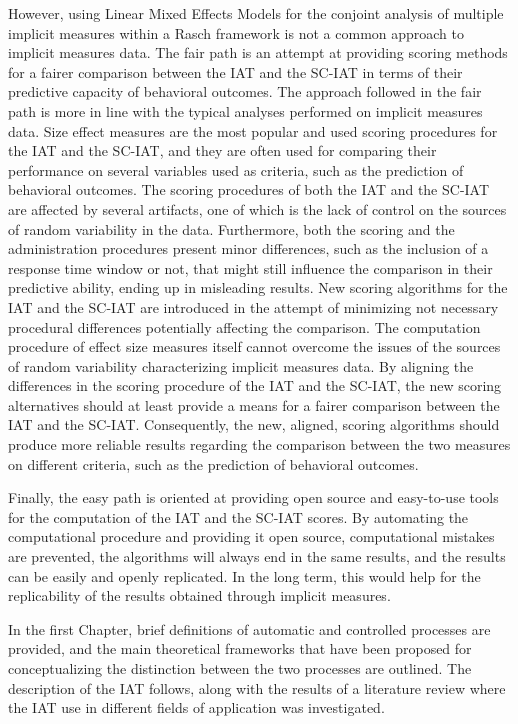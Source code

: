 \documentclass[12pt]{book}
\begin{document}
However, using Linear Mixed Effects Models for the conjoint analysis of multiple implicit measures within a Rasch framework is not a common approach to implicit measures data. The fair path is an attempt at providing scoring methods for a fairer comparison between the IAT and the SC-IAT in terms of their predictive capacity of behavioral outcomes. 
The approach followed in the fair path is more in line with the typical analyses performed on implicit measures data.
Size effect measures are the most popular and used scoring procedures for the IAT and the SC-IAT, and they are often used for comparing their performance on several variables used as criteria, such as the prediction of behavioral outcomes. 
The scoring procedures of both the IAT and the SC-IAT are affected by several artifacts, one of which is the lack of control on the sources of random variability in the data. Furthermore, both the scoring and the administration procedures present minor differences, such as the inclusion of a response time window or not, that might still influence the comparison in their predictive ability, ending up in misleading results.
New scoring algorithms for the IAT and the SC-IAT are introduced in the attempt of minimizing not necessary procedural differences potentially affecting the comparison.
The computation procedure of effect size measures itself cannot overcome the issues of the sources of random variability characterizing implicit measures data. 
By aligning the differences in the scoring procedure of the IAT and the SC-IAT, the new scoring alternatives should at least provide a means for a fairer comparison between the IAT and the SC-IAT. 
Consequently, the new, aligned, scoring algorithms should produce more reliable results regarding the comparison between the two measures on different criteria, such as the prediction of behavioral outcomes.

Finally, the easy path is oriented at providing open source and easy-to-use tools for the computation of the IAT and the SC-IAT scores. By automating the computational procedure and providing it open source, computational mistakes are prevented, the algorithms will always end in the same results, and the results can be easily and openly replicated. In the long term, this would help for the replicability of the results obtained through implicit measures.


In the first Chapter, brief definitions of automatic and controlled processes are provided, and the main theoretical frameworks that have been proposed for conceptualizing the distinction between the two processes are outlined.  
The description of the IAT follows, along with the results of a literature review where the IAT use in different fields of application was investigated.
\end{document}
